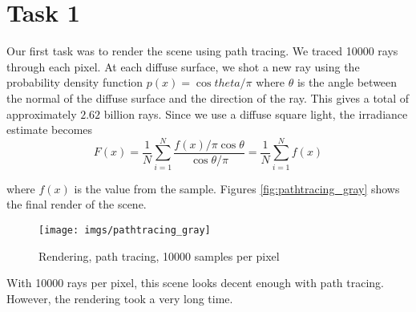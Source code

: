 \section*{Task 1}
Our first task was to render the scene using path tracing. We traced 10000 rays through each pixel. At each diffuse surface, we shot a new ray using the probability density function $p(x)=\cos theta / \pi$ where $\theta$ is the angle between the normal of the diffuse surface and the direction of the ray. This gives a total of approximately $2.62$ billion rays. Since we use a diffuse square light, the irradiance estimate becomes
$$
F(x) = \frac{1}{N} \sum_{i=1}^N \frac{f(x)/\pi \cos \theta}{\cos \theta / \pi} = \frac{1}{N} \sum_{i=1}^N f(x)
$$

where $f(x)$ is the value from the sample. Figures \ref{fig:pathtracing_gray} shows the final render of the scene. 
\begin{figure}[H]
    \texttt{[image: imgs/pathtracing\_gray]}\\
    \caption{Rendering, path tracing, 10000 samples per pixel}
    \label{fig:pathtracing}
\end{figure}

With 10000 rays per pixel, this scene looks decent enough with path tracing. However, the rendering took a very long time.

